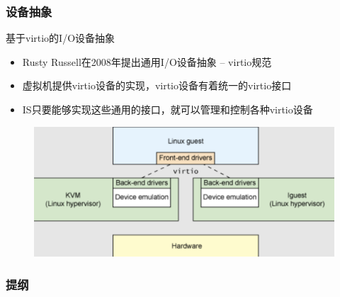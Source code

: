 \begin{frame}[fragile]
    \frametitle{设备抽象}
    基于virtio的I/O设备抽象
    \begin{itemize}
        \item Rusty Russell在2008年提出通用I/O设备抽象 – virtio规范
        \item 虚拟机提供virtio设备的实现，virtio设备有着统一的virtio接口
        \item IS只要能够实现这些通用的接口，就可以管理和控制各种virtio设备
    \end{itemize}
    \begin{figure}
        \includegraphics[width=0.6\linewidth]{figs/virtio.png}
    \end{figure}
\end{frame}
\begin{frame}
\frametitle{提纲} %
\tableofcontents %


\end{frame}
